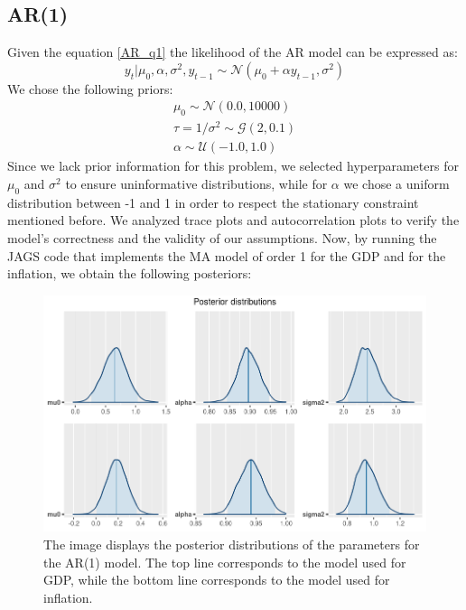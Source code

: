 \subsection*{AR(1)}
Given the equation \ref{AR_q1} the likelihood of the AR model can be expressed as:
\begin{equation}
    y_{t}|\mu_{0},\alpha,\sigma^2,y_{t-1}\sim \mathcal{N}(\mu_{0} + \alpha y_{t-1}, \sigma^2)
\end{equation}
We chose the following priors:
\begin{equation}
    \begin{split}
        \mu_0 \sim \mathcal{N}(0.0, 10000) \\
        \tau = 1 / \sigma^2 \sim \mathcal{G}(2, 0.1) \\
        \alpha \sim \mathcal{U}(-1.0, 1.0)
    \end{split}
\end{equation}
Since we lack prior information for this problem, we selected hyperparameters for $\mu_{0}$ and $\sigma^2$ to ensure uninformative distributions, while for $\alpha$ we chose a uniform distribution between -1 and 1 in order to respect the stationary constraint mentioned before.
We analyzed trace plots and autocorrelation plots to verify the model's correctness and the validity of our assumptions.
Now, by running the JAGS code that implements the MA model of order 1 for the GDP and for the inflation, we obtain the following posteriors: \\
\begin{figure}[h]
    \centering
    \includegraphics[width=\textwidth]{images/2-AR/posteriors.png}
    \caption{The image displays the posterior distributions of the parameters for the AR(1) model. The top line corresponds to the model used for GDP, while the bottom line corresponds to the model used for inflation.}
    \label{fig:AR_posteriors}
\end{figure} \\

